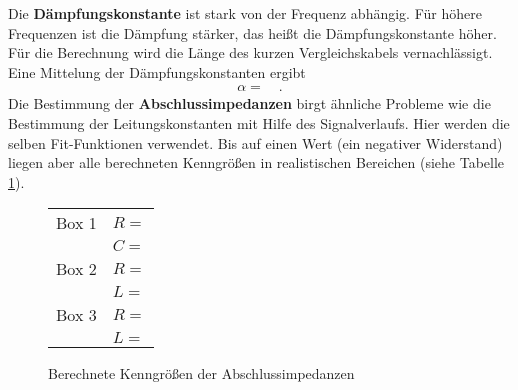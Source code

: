Die \textbf{Dämpfungskonstante} ist stark von der Frequenz abhängig. Für höhere Frequenzen ist die Dämpfung stärker, das heißt die Dämpfungskonstante höher. Für die Berechnung wird die Länge des kurzen Vergleichskabels vernachlässigt. Eine Mittelung der Dämpfungskonstanten ergibt
\begin{align*}
	\alpha =  \quad.
\end{align*}
Die Bestimmung der \textbf{Abschlussimpedanzen} birgt ähnliche Probleme wie die Bestimmung der Leitungskonstanten mit Hilfe des Signalverlaufs. Hier werden die selben Fit-Funktionen verwendet. Bis auf einen Wert (ein negativer Widerstand) liegen aber alle berechneten Kenngrößen in realistischen Bereichen (siehe Tabelle \ref{tab:diskussion}).
\begin{figure}
	\centering
\begin{tabular}{l|l}
	Box 1   & $R=  $ \\
		& $C = $ \\
	\hline  Box 2 &  $R = $ \\
	& $L = $\\ 
	\hline  Box 3 & $R = $ \\
	&$L  = $ \\ 

\end{tabular} 
\caption{Berechnete Kenngrößen der Abschlussimpedanzen}
\label{tab:diskussion}
\end{figure}
